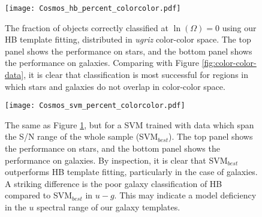 \documentclass[12pt,preprint]{aastex}
\begin{document}

\begin{figure}
\centering
\texttt{[image: Cosmos\_hb\_percent\_colorcolor.pdf]}
\caption{The fraction of objects correctly classified at
  $\ln(\Omega)=0$ using our HB template fitting, distributed in {\it
    ugriz} color-color space.  The top panel shows the performance on stars, and the bottom panel shows the performance on galaxies.  Comparing with Figure
  \ref{fig:color-color-data}, it is clear that classification is most
  successful for regions in which stars and galaxies do not overlap in
  color-color space.}
\label{fig:color-color-hb-fraction}
\end{figure}

\begin{figure}
\centering
\texttt{[image: Cosmos\_svm\_percent\_colorcolor.pdf]}
\caption{The same as Figure \ref{fig:color-color-hb-fraction}, but for
  a SVM trained with data which span the S/N range of the whole sample
  (SVM$_{best}$).    The top panel shows the performance on stars, and the bottom panel shows the performance on galaxies.  By inspection, it is clear that SVM$_{best}$
  outperforms HB template fitting, particularly in the case of
  galaxies.  A striking difference is the poor galaxy classification
  of HB compared to SVM$_{best}$ in $u-g$.  This may indicate a model
  deficiency in the $u$ spectral range of our galaxy templates.}
\label{fig:color-color-svm-fraction}
\end{figure}
\end{document}
